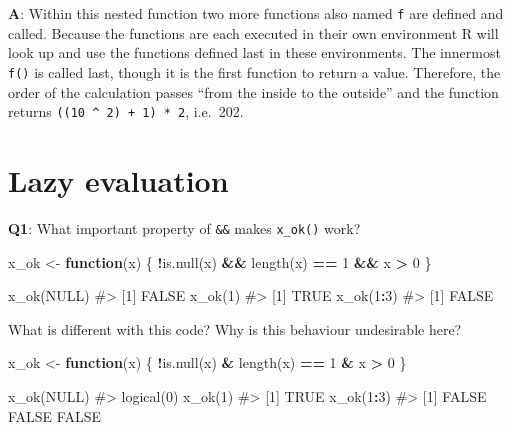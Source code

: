 \documentclass[
]{krantz}
\makeatletter
\newenvironment{Shaded}{\begin{snugshade}}{\end{snugshade}}
\newcommand{\CommentTok}[1]{\textcolor[rgb]{0.56,0.35,0.01}{\textit{#1}}}
\newcommand{\ControlFlowTok}[1]{\textcolor[rgb]{0.13,0.29,0.53}{\textbf{#1}}}
\newcommand{\DecValTok}[1]{\textcolor[rgb]{0.00,0.00,0.81}{#1}}
\newcommand{\KeywordTok}[1]{\textcolor[rgb]{0.13,0.29,0.53}{\textbf{#1}}}
\newcommand{\NormalTok}[1]{#1}
\newcommand{\OperatorTok}[1]{\textcolor[rgb]{0.81,0.36,0.00}{\textbf{#1}}}
\newcommand{\OtherTok}[1]{\textcolor[rgb]{0.56,0.35,0.01}{#1}}
\newcommand{\StringTok}[1]{\textcolor[rgb]{0.31,0.60,0.02}{#1}}
\newenvironment{kframe}{%
\medskip{}
\setlength{\fboxsep}{.8em}
 \def\at@end@of@kframe{}%
 \ifinner\ifhmode%
  \def\at@end@of@kframe{\end{minipage}}%
  \begin{minipage}{\columnwidth}%
 \fi\fi%
 \def\FrameCommand##1{\hskip\@totalleftmargin \hskip-\fboxsep
 \colorbox{shadecolor}{##1}\hskip-\fboxsep
     \hskip-\linewidth \hskip-\@totalleftmargin \hskip\columnwidth}%
 \MakeFramed {\advance\hsize-\width
   \@totalleftmargin\z@ \linewidth\hsize
   \@setminipage}}%
 {\par\unskip\endMakeFramed%
 \at@end@of@kframe}
\renewenvironment{Shaded}{\begin{kframe}}{\end{kframe}}
\renewcommand{\KeywordTok} [1]{\textcolor[rgb]{0.00,0.44,0.13}{{#1}}}
\renewcommand{\DecValTok}  [1]{\textcolor[rgb]{0.25,0.63,0.44}{{#1}}}
\renewcommand{\StringTok}  [1]{\textcolor[rgb]{0.25,0.44,0.63}{{#1}}}
\renewcommand{\CommentTok} [1]{\textcolor[rgb]{0.38,0.63,0.69}{{#1}}}
\renewcommand{\OtherTok}   [1]{\textcolor[rgb]{0.00,0.44,0.13}{{#1}}}
\renewcommand{\NormalTok}  [1]{{#1}}
\makeatother
\begin{document}
\textbf{{A}}: Within this nested function two more functions also named \texttt{f} are defined and called. Because the functions are each executed in their own environment R will look up and use the functions defined last in these environments. The innermost \texttt{f()} is called last, though it is the first function to return a value. Therefore, the order of the calculation passes ``from the inside to the outside'' and the function returns \texttt{((10\ \^{}\ 2)\ +\ 1)\ *\ 2}, i.e.~202.

\hypertarget{lazy-evaluation}{%
\section{Lazy evaluation}\label{lazy-evaluation}}

\textbf{{Q1}}: What important property of \texttt{\&\&} makes \texttt{x\_ok()} work?

\begin{Shaded}
\begin{Highlighting}[]
\NormalTok{x_ok <-}\StringTok{ }\ControlFlowTok{function}\NormalTok{(x) \{}
  \OperatorTok{!}\KeywordTok{is.null}\NormalTok{(x) }\OperatorTok{&&}\StringTok{ }\KeywordTok{length}\NormalTok{(x) }\OperatorTok{==}\StringTok{ }\DecValTok{1} \OperatorTok{&&}\StringTok{ }\NormalTok{x }\OperatorTok{>}\StringTok{ }\DecValTok{0}
\NormalTok{\}}

\KeywordTok{x_ok}\NormalTok{(}\OtherTok{NULL}\NormalTok{)}
\CommentTok{#> [1] FALSE}
\KeywordTok{x_ok}\NormalTok{(}\DecValTok{1}\NormalTok{)}
\CommentTok{#> [1] TRUE}
\KeywordTok{x_ok}\NormalTok{(}\DecValTok{1}\OperatorTok{:}\DecValTok{3}\NormalTok{)}
\CommentTok{#> [1] FALSE}
\end{Highlighting}
\end{Shaded}

What is different with this code? Why is this behaviour undesirable here?

\begin{Shaded}
\begin{Highlighting}[]
\NormalTok{x_ok <-}\StringTok{ }\ControlFlowTok{function}\NormalTok{(x) \{}
  \OperatorTok{!}\KeywordTok{is.null}\NormalTok{(x) }\OperatorTok{&}\StringTok{ }\KeywordTok{length}\NormalTok{(x) }\OperatorTok{==}\StringTok{ }\DecValTok{1} \OperatorTok{&}\StringTok{ }\NormalTok{x }\OperatorTok{>}\StringTok{ }\DecValTok{0}
\NormalTok{\}}

\KeywordTok{x_ok}\NormalTok{(}\OtherTok{NULL}\NormalTok{)}
\CommentTok{#> logical(0)}
\KeywordTok{x_ok}\NormalTok{(}\DecValTok{1}\NormalTok{)}
\CommentTok{#> [1] TRUE}
\KeywordTok{x_ok}\NormalTok{(}\DecValTok{1}\OperatorTok{:}\DecValTok{3}\NormalTok{)}
\CommentTok{#> [1] FALSE FALSE FALSE}
\end{Highlighting}
\end{Shaded}
\end{document}
